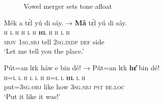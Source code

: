 \begin{figure}    
\caption{Vowel merger sets tone afloat}
\label{fig:key:3.15} 
\end{figure}

\ea\label{ex:key:53}
\glll Mék    a    tɛ́l  yú    di  sáy.    →   \textbf{Mâ}    tɛ́l  yú  di  sáy.\\
\textsc{h}    \textsc{l}    \textsc{h}  \textsc{h}    \textsc{l}  \textsc{h}  {}  \textbf{\textsc{hl}}    \textsc{h}  \textsc{h}  \textsc{l}  \textsc{h}\\
\textsc{sbjv}    \textsc{1sg.sbj}  tell  \textsc{2sg.indp}  \textsc{def}  side\\
\glt ‘Let me tell you the place.’\\
\z

\ea\label{ex:key:54}
\glll   Pút=an    lɛk  háw  e    bin  dé!  →  Pút=an  lɛk  \textbf{h\^ɛ}  bin  dé!\\
\textsc{h}=\textsc{l}    \textsc{l}  \textsc{h}  \textsc{l}    \textsc{l}  \textsc{h}    {}  \textsc{h}=\textsc{l}  \textsc{l}  \textbf{\textsc{hl}}  \textsc{l}  \textsc{h}\\
put=\textsc{3sg.obj}  like  how  \textsc{3sg.sbj}  \textsc{pst}  \textsc{be.loc}\\
\glt ‘Put it like it was!’\\
\z


